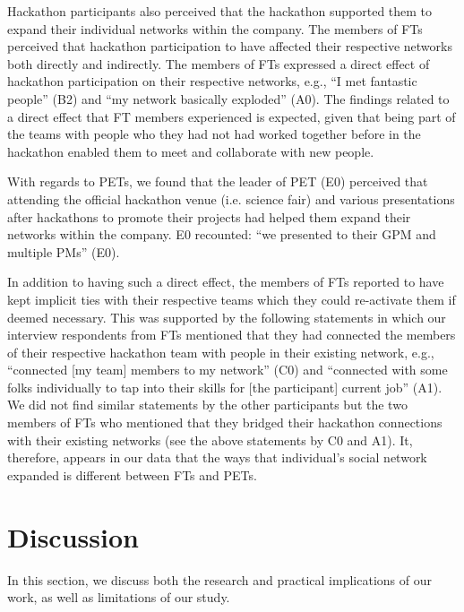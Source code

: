 \documentclass{hcij}
\begin{document}
Hackathon participants also perceived that the hackathon supported them to expand their individual networks within the company. The members of FTs perceived that hackathon participation to have affected their respective networks both directly and indirectly. The members of FTs expressed a direct effect of hackathon participation on their respective networks, e.g., “I met fantastic people” (B2) and “my network basically exploded” (A0). The findings related to a direct effect that FT members experienced is expected, given that being part of the teams with people who they had not had worked together before in the hackathon enabled them to meet and collaborate with new people.

With regards to PETs, we found that the leader of PET (E0) perceived that attending the official hackathon venue (i.e. science fair) and various presentations after hackathons to promote their projects had helped them expand their networks within the company. E0 recounted: “we presented to their GPM and multiple PMs” (E0).

In addition to having such a direct effect, the members of FTs reported to have kept implicit ties with their respective teams which they could re-activate them if deemed necessary. This was supported by the following statements in which our interview respondents from FTs mentioned that they had connected the members of their respective hackathon team with people in their existing network, e.g., “connected [my team] members to my network” (C0) and “connected with some folks individually to tap into their skills for [the participant] current job” (A1). We did not find similar statements by the other participants but the two members of FTs who mentioned that they bridged their hackathon connections with their existing networks (see the above statements by C0 and A1). It, therefore, appears in our data that the ways that individual’s social network expanded is different between FTs and PETs.

\section{Discussion}
In this section, we discuss both the research and practical implications of our work, as well as limitations of our study.
\end{document}
